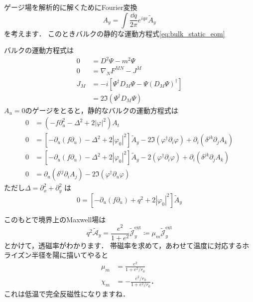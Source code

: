 \documentclass[b5paper,11pt,dvipdfmx]{jsarticle}
\numberwithin{equation}{section}
\theoremstyle{definition}
\begin{document}
ゲージ場を解析的に解くためにFourier変換
\begin{equation}
    A_y = \int \frac{\dd q}{2 \pi} e^{iqx} \tilde{A}_y
\end{equation}
を考えます．
このときバルクの静的な運動方程式\eqref{eq:bulk_static_eom}

バルクの運動方程式は
\begin{equation}
    \label{eq:bulk_eom}
    \begin{split}
        0
        &= D^2 \Psi - m^2 \Psi \\
        0
        &= \nabla_N F^{MN} - J^M\\
        J_M
        &= - i \left[ \Psi^\dag D_M \Psi - \Psi \left(D_M \Psi\right)^\dag \right] \\
        &= 2 \mathfrak{I} (\Psi^\dag D_M \Psi)
    \end{split}
\end{equation}
$A_u = 0$のゲージをとると，静的なバルクの運動方程式は
\begin{equation}
    \label{eq:bulk_static_eom}
    \begin{split}
        0
        &= \left( - f \partial_u^2 - \Delta^2 + 2|\varphi|^2 \right) A_t\\
        0
        &= \left[ - \partial_u (f \partial_u) - \Delta^2 + 2|\varphi_0|^2 \right] \tilde{A}_y
        - 2 \mathfrak{I} (\varphi^\dag \partial_i \varphi)
        + \partial_i (\delta^{jk} \partial_j A_k)\\
        0
        &= \left[ - \partial_u (f \partial_u) - \Delta^2 + 2|\varphi_0|^2 \right] \tilde{A}_y
        - 2 (\varphi^\dag \partial_i \varphi)
        + \partial_i (\delta^{jk} \partial_j A_k)\\
        0
        &= \partial_u (\delta^{ij} \partial_i A_j)
        - 2 \mathfrak{I} (\varphi^\dag \partial_u \varphi)
    \end{split}
\end{equation}
ただし$\Delta = \partial_x^2 + \partial_y^2$
は
\begin{equation}
    0 = \left[ - \partial_u (f \partial_u) + q^2 + 2|\varphi_0|^2 \right] \tilde{A}_y
\end{equation}





このもとで境界上のMaxwell場は
\begin{equation}
    q^2 \tilde{\mathcal{A}}_y
    = \frac{e^2}{1 + e^2} \tilde{\mathcal{J}}^{\text{ext}}_y
    \coloneq \mu_m \tilde{\mathcal{J}}^{\text{ext}}_y
\end{equation}
とかけて，透磁率がわかります．
帯磁率を求めて，あわせて温度に対応するホライズン半径を陽に描いてやると
\begin{equation}
    \begin{split}
            \mu_m
            &= \frac{e^2}{1 + e^2 / r_0}\\
            \chi_m
            &= - \frac{e^2 / r_0}{1 + e^2 / r_0}．
    \end{split}
\end{equation}
これは低温で完全反磁性になりますね．
\end{document}
